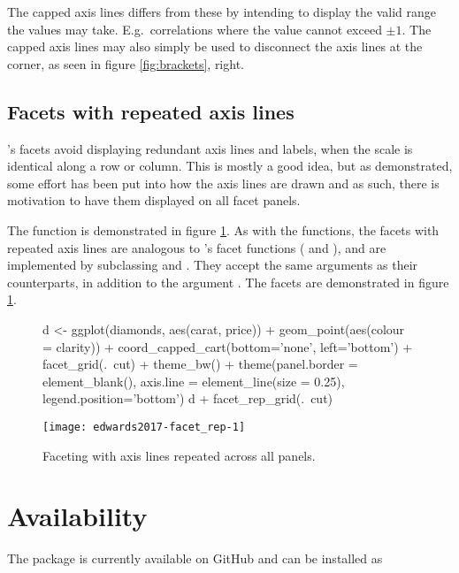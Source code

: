 The capped axis lines differs from these by intending to display the
valid range the values may take. E.g.~correlations where the value
cannot exceed \(\pm 1\). The capped axis lines may also simply be used
to disconnect the axis lines at the corner, as seen in figure
\ref{fig:brackets}, right.

\subsection{Facets with repeated axis lines}

's facets avoid displaying redundant axis lines and
labels, when the scale is identical along a row or column. This is
mostly a good idea, but as demonstrated, some effort has been put into
how the axis lines are drawn and as such, there is motivation to have
them displayed on all facet panels.

The function  is demonstrated in figure
\ref{fig:facet_rep}. As with the  functions, the
facets with repeated axis lines are analogous to 's
facet functions ( and ), and are
implemented by subclassing  and . They
accept the same arguments as their  counterparts, in
addition to the argument . The facets are
demonstrated in figure \ref{fig:facet_rep}.

\begin{figure}[h!]

\begin{Sinput}
d <- ggplot(diamonds, aes(carat, price)) +
  geom_point(aes(colour = clarity)) + 
  coord_capped_cart(bottom='none', left='bottom') +
  facet_grid(.~cut) + theme_bw() + 
  theme(panel.border = element_blank(), axis.line = element_line(size = 0.25),
        legend.position='bottom')
d + facet_rep_grid(.~cut)
\end{Sinput}

\texttt{[image: edwards2017-facet\_rep-1]} 
  \caption{Faceting with axis lines repeated across all panels.}
  \label{fig:facet_rep}
\end{figure}

\section{Availability}

The  package is currently available on GitHub and can be
installed as

